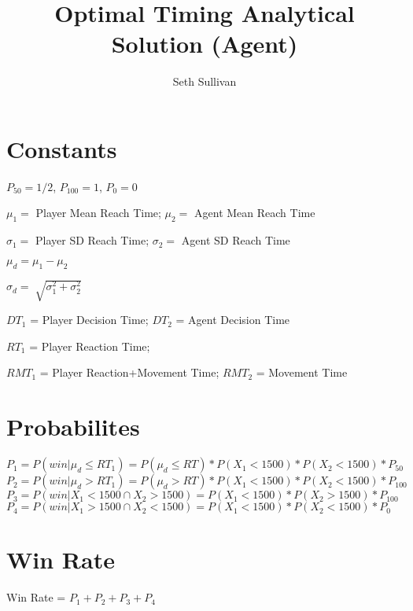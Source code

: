 \documentclass{article}
\title{Optimal Timing Analytical Solution (Agent)}
\author{Seth Sullivan}
\begin{document}
\maketitle
\setcounter{secnumdepth}{0}
\begin{center}
\section{Constants}

$P_{50} = 1/2$, $P_{100} = 1$, $P_{0} = 0$

$\mu_{1} =$ Player Mean Reach Time; $\mu_{2} =$ Agent Mean Reach Time

$\sigma_{1} = $ Player SD Reach Time; $\sigma_{2} = $ Agent SD Reach Time

$\mu_{d} = \mu_{1} - \mu_{2}$

$\sigma_{d} = \sqrt[]{\sigma_{1}^2 + \sigma_{2}^2}$

$DT_{1}$ = Player Decision Time; $DT_{2}$ = Agent Decision Time

$RT_{1}$ = Player Reaction Time;

$RMT_{1}$ = Player Reaction+Movement Time; $RMT_{2}$ = Movement Time

\section{Probabilites}
$P_{1} = P(win|\mu_{d} \le RT_{1}) = P(\mu_d \le RT)*P(X_{1}<1500)*P(X_{2}<1500)*P_{50}$
$P_{2} = P(win|\mu_{d} > RT_{1}) = P(\mu_d > RT)*P(X_{1}<1500)*P(X_{2}<1500)*P_{100}$
$P_{3} = P(win|X_{1}<1500 \cap X_{2}>1500) = P(X_{1}<1500)*P(X_{2}>1500)*P_{100}$
$P_{4} = P(win|X_{1}>1500 \cap X_{2}<1500) = P(X_{1}<1500)*P(X_{2}<1500)*P_{0}$

\section{Win Rate}
Win Rate = $P_{1}+P_{2}+P_{3}+P_{4}$
\end{center}
\end{document}
